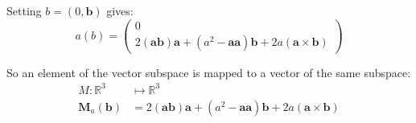 \documentclass[11pt]{article}
\newcommand{\vvv}[1]{\ensuremath{\begin{pmatrix}#1\end{pmatrix}}}
\begin{document}
Setting $b=(0, \mathbf{b})$ gives:
\begin{equation}
    a(b) = \vvv{
        0 \\
        2(\mathbf{a}\mathbf{b})\mathbf{a} 
        + (a^2 - \mathbf{a}\mathbf{a})\mathbf{b}
        + 2a(\mathbf{a} \times \mathbf{b})
    }
\end{equation}

So an element of the vector subspace is mapped to a vector of the same subspace:
\begin{equation}
    \begin{aligned}
        M \colon \mathbb{R}^3 &\mapsto \mathbb{R}^3 \\
        \mathbf{M}_a(\mathbf{b}) &= 2(\mathbf{a}\mathbf{b})\mathbf{a} 
            + (a^2 - \mathbf{a}\mathbf{a})\mathbf{b}
            + 2a(\mathbf{a} \times \mathbf{b})
    \end{aligned}   
\end{equation}
\end{document}
